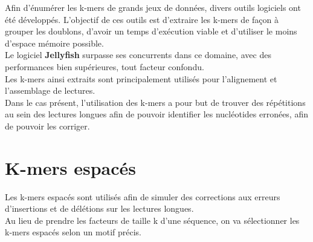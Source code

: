 \documentclass{report}
\begin{document}
      Afin d'énumérer les k-mers de grands jeux de données, divers outils logiciels ont été développés. L'objectif de ces outils est d'extraire les k-mers de façon à grouper les doublons, d'avoir un temps d'exécution viable et d'utiliser le moins d'espace mémoire possible.\\

      Le logiciel \textbf{Jellyfish} \cite{Marcais2011} surpasse ses concurrents dans ce domaine, avec des performances bien supérieures, tout facteur confondu.\\

      Les k-mers ainsi extraits sont principalement utilisés pour l'alignement et l'assemblage de lectures.\\

      Dans le cas présent, l'utilisation des k-mers a pour but de trouver des répétitions au sein des lectures longues afin de pouvoir identifier les nucléotides erronées, afin de pouvoir les corriger.
    \section{K-mers espacés}
      Les k-mers espacés sont utilisés afin de simuler des corrections aux erreurs d'insertions et de délétions sur les lectures longues.\\
      Au lieu de prendre les facteurs de taille k d'une séquence, on va sélectionner les k-mers espacés selon un motif précis.\\
\end{document}
